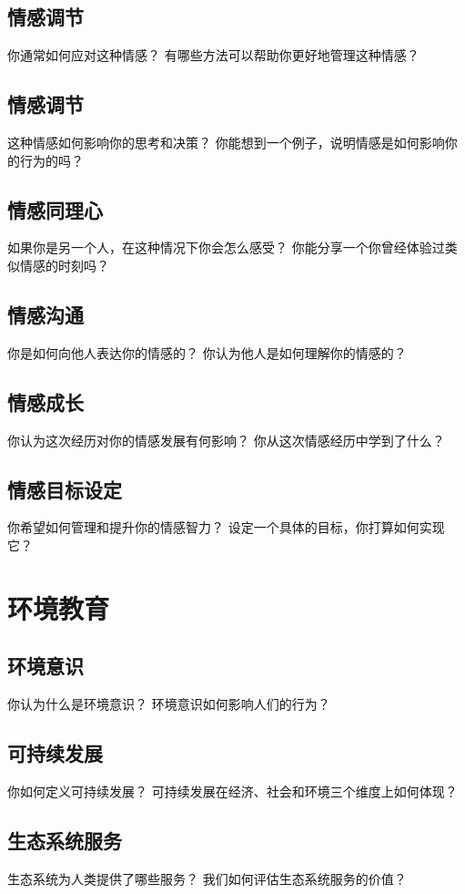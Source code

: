 \documentclass[12pt]{book}
\begin{document}
\subsection{情感调节}
你通常如何应对这种情感？
有哪些方法可以帮助你更好地管理这种情感？

\subsection{情感调节}
这种情感如何影响你的思考和决策？
你能想到一个例子，说明情感是如何影响你的行为的吗？


\subsection{情感同理心}
如果你是另一个人，在这种情况下你会怎么感受？
你能分享一个你曾经体验过类似情感的时刻吗？

\subsection{情感沟通}
你是如何向他人表达你的情感的？
你认为他人是如何理解你的情感的？

\subsection{情感成长}
你认为这次经历对你的情感发展有何影响？
你从这次情感经历中学到了什么？


\subsection{情感目标设定}
你希望如何管理和提升你的情感智力？
设定一个具体的目标，你打算如何实现它？



\section{环境教育}
\subsection{环境意识}
你认为什么是环境意识？
环境意识如何影响人们的行为？

\subsection{可持续发展}
你如何定义可持续发展？
可持续发展在经济、社会和环境三个维度上如何体现？


\subsection{生态系统服务}
生态系统为人类提供了哪些服务？
我们如何评估生态系统服务的价值？
\end{document}
